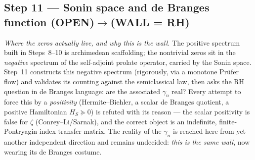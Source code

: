\documentclass[11pt]{amsart}
\theoremstyle{definition}
\theoremstyle{remark}
\newcommand{\OPEN}{\textbf{(OPEN)}}
\newcommand{\WALL}{\textbf{(WALL = RH)}}
\begin{document}
\subsection{Step 11 --- Sonin space and de Branges function \OPEN$\to$\WALL}

\emph{Where the zeros actually live, and why this is the wall.} The positive spectrum built in
Steps~8--10 is archimedean scaffolding; the nontrivial zeros sit in the \emph{negative} spectrum
of the self-adjoint prolate operator, carried by the Sonin space. Step~11 constructs this
negative spectrum (rigorously, via a monotone Pr\"ufer flow) and validates its counting against
the semiclassical law, then asks the RH question in de Branges language: are the associated
$\gamma_n$ real? Every attempt to force this by a \emph{positivity} (Hermite--Biehler, a scalar
de Branges quotient, a positive Hamiltonian $H_S\succeq0$) is refuted with its reason --- the
scalar positivity is false for $\zeta$ (Conrey--Li/Sarnak), and the correct object is an
indefinite, finite-Pontryagin-index transfer matrix. The reality of the $\gamma_n$ is reached
here from yet another independent direction and remains undecided: \emph{this is the same wall},
now wearing its de Branges costume.
\end{document}
